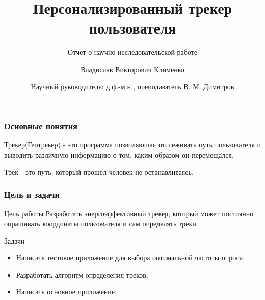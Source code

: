 \documentclass[hyperref={unicode}]{beamer}
\title[%
    Бобры и Интернет
]{%
	Персонализированный трекер\\
	пользователя
}
\subtitle{Отчет о научно-исследовательской работе}
\author[%
    Владислав Клименко
]{%
    Владислав Викторович Клименко
}
\date[%
    01.06.2018
]{%
    Научный руководитель: д.ф.-м.н., преподаватель  В. М. Димитров
}
\institute[%
    ПетрГУ
]{%
    Петрозаводский государственный университет\\
    Кафедра информатики и математического обеспечения
}
\begin{document}
\begin{frame}
\maketitle
\end{frame}

\begin{frame}
  \frametitle{Основные понятия}
  Трекер(Геотрекер) - это программа позволяющая отслеживать путь пользователя и выводить
  различную информацию о том, каким образом он перемещался.
  
  Трек - это путь, который прошёл человек не останавливаясь.
\end{frame}

\begin{frame}
  \frametitle{Цель и задачи}
  \begin{block}{Цель работы}
    Разработать энергоэффективный трекер, который может
    постоянно опрашивать координаты пользователя и сам определять треки
  \end{block}
  \begin{block}{Задачи}
  \begin{itemize}
  	\item Написать тестовое приложение для выбора оптимальной частоты опроса.
  	\item Разработать алгоритм определения треков.
  	\item Написать основное приложение.
  \end{itemize}
  \end{block}
\end{frame}
\end{document}
